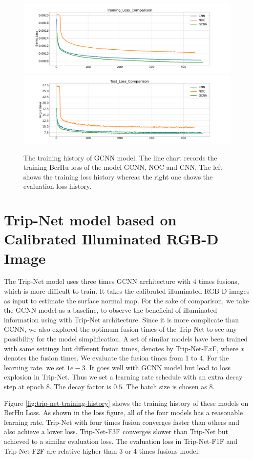 \documentclass[border=15pt, multi, tikz]{article}
\begin{document}
\begin{figure}[th]
	\centering
	\includegraphics[width=.45\textwidth]{./Figures/gcnn_training_loss.png}
	\includegraphics[width=.45\textwidth]{./Figures/gcnn_eval_loss.png}
	\caption{The training history of GCNN model. The line chart records the training BerHu loss of the model GCNN, NOC and CNN. The left shows the training loss history whereas the right one shows the evaluation loss history.}
	\label{fig:gcnn-training-history}
\end{figure}

\section{Trip-Net model based on Calibrated Illuminated RGB-D Image}
The Trip-Net model uses three times GCNN architecture with 4 times fusions, which is more difficult to train. It takes the calibrated illuminated RGB-D images as input to estimate the surface normal map. For the sake of comparison, we take the GCNN model as a baseline, to observe the beneficial of illuminated information using with Trip-Net architecture. Since it is more complicate than GCNN, we also explored the optimum fusion times of the Trip-Net to see any possibility for the model simplification. A set of similar models have been trained with same settings but different fusion times, denotes by Trip-Net-F$ x $F, where $ x $ denotes the fusion times. We evaluate the fusion times from 1 to 4. For the learning rate.  we set $ 1e-3 $. It goes well with GCNN model but lead to loss explosion in Trip-Net. Thus we set a learning rate schedule with an extra decay step at epoch 8. The decay factor is $ 0.5$. The batch size is chosen as 8.

Figure \ref{fig:trip-net-training-history} shows the training history of these models on BerHu Loss. As shown in the loss figure, all of the four models has a reasonable learning rate. Trip-Net with four times fusion converges faster than others and also achieve a lower loss. Trip-Net-F3F converges slower than Trip-Net but achieved to a similar evaluation loss. The evaluation loss in Trip-Net-F1F and Trip-Net-F2F are relative higher than 3 or 4 times fusions model. 
\end{document}
